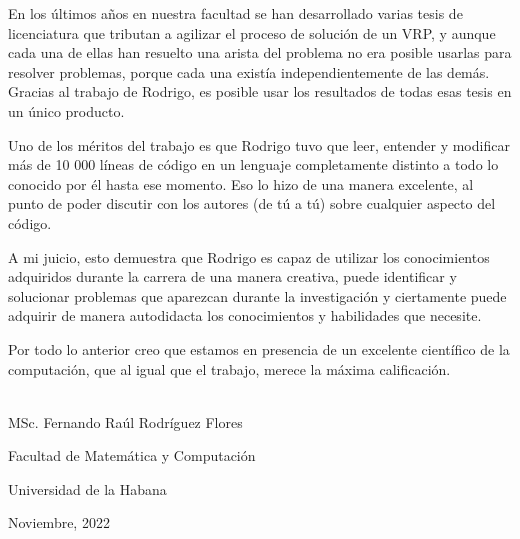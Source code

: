 \begin{opinion}	
	
En los últimos años en nuestra facultad se han desarrollado varias tesis de licenciatura que tributan a agilizar el proceso de solución de un VRP, y aunque cada una de ellas han resuelto una arista del problema no era posible usarlas para resolver problemas, porque cada una existía independientemente de las demás.  Gracias al trabajo de Rodrigo, es posible usar los resultados de todas esas tesis en un único producto.

Uno de los méritos del trabajo es que Rodrigo tuvo que leer, entender y modificar más de 10 000 líneas de código en un lenguaje completamente distinto a todo lo conocido por él hasta ese momento.  Eso lo hizo de una manera excelente, al punto de poder discutir con los autores (de tú a tú) sobre cualquier aspecto del código.

A mi juicio, esto demuestra que Rodrigo es capaz de utilizar los conocimientos adquiridos durante la carrera de una manera creativa, puede identificar y solucionar problemas que aparezcan durante la investigación y ciertamente puede adquirir de manera autodidacta los conocimientos y habilidades que necesite.

Por todo lo anterior creo que estamos en presencia de un excelente científico de la computación, que al igual que el trabajo, merece la máxima calificación.


\vspace{1cm}


\begin{flushright}
	\underline{\hspace{6.5cm}}\\
	MSc. Fernando Raúl Rodríguez Flores
	
	Facultad de Matemática y Computación
	
	Universidad de la Habana
	
	Noviembre, 2022
\end{flushright}

\end{opinion}